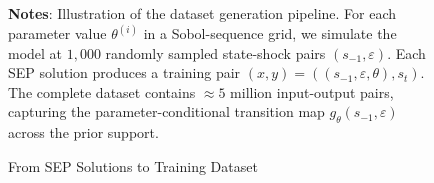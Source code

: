\begin{figure}[h]
\begin{tikzpicture}[scale=0.9]
\end{tikzpicture}
\caption{From SEP Solutions to Training Dataset}
\label{fig:sep_to_training}
\begin{flushleft}
\footnotesize
\textbf{Notes}: Illustration of the dataset generation pipeline. For each parameter value $\theta^{(i)}$ in a Sobol-sequence grid, we simulate the model at $1{,}000$ randomly sampled state-shock pairs $(s_{-1}, \varepsilon)$. Each SEP solution produces a training pair $(x, y) = ((s_{-1}, \varepsilon, \theta), s_t)$. The complete dataset contains $\approx 5$ million input-output pairs, capturing the parameter-conditional transition map $g_\theta(s_{-1}, \varepsilon)$ across the prior support.
\end{flushleft}
\end{figure}

\clearpage

